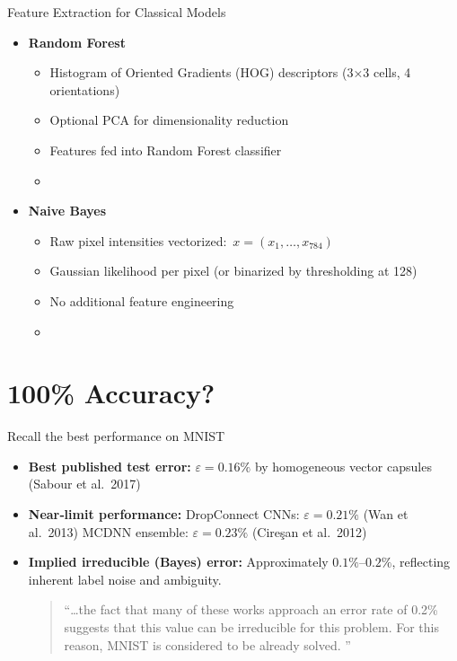 \documentclass[german,10pt]{beamer}
\begin{document}
\begin{frame}{Feature Extraction for Classical Models}
  \begin{itemize}
    \item \textbf{Random Forest}
      \begin{itemize}
        \item Histogram of Oriented Gradients (HOG) descriptors  
              (3×3 cells, 4 orientations)  
        \item Optional PCA for dimensionality reduction  
        \item Features fed into Random Forest classifier  
        \item \cite{Khan2017RF}
      \end{itemize}
    \item \textbf{Naive Bayes}
      \begin{itemize}
        \item Raw pixel intensities vectorized:  
              \(\,x = (x_1,\dots,x_{784})\)\  
        \item Gaussian likelihood per pixel (or binarized by thresholding at 128)  
        \item No additional feature engineering  
        \item \cite{Kothari2020NB}
      \end{itemize}
  \end{itemize}
\end{frame}

\section{100\% Accuracy?}


\begin{frame}{Recall the best performance on MNIST}
  \begin{itemize}
    \item \textbf{Best published test error:}  
      $\varepsilon = 0.16\%$ by homogeneous vector capsules (Sabour et al.\ 2017) \cite{Sabour2017}
    \item \textbf{Near‐limit performance:}  
      DropConnect CNNs: $\varepsilon = 0.21\%$ (Wan et al.\ 2013) \cite{Wan2013}  
      MCDNN ensemble: $\varepsilon = 0.23\%$ (Cireşan et al.\ 2012) \cite{Ciresan2012}
    \item \textbf{Implied irreducible (Bayes) error:}  
      Approximately $0.1\%$–$0.2\%$, reflecting inherent label noise and ambiguity. \begin{quote} ``…the fact that many of these works approach an error rate of 0.2\% suggests that this value can be irreducible for this problem. For this reason, MNIST is considered to be already solved.  \cite{Baldominos2019}''
  \end{quote}
  \end{itemize}
\end{frame}
\end{document}
